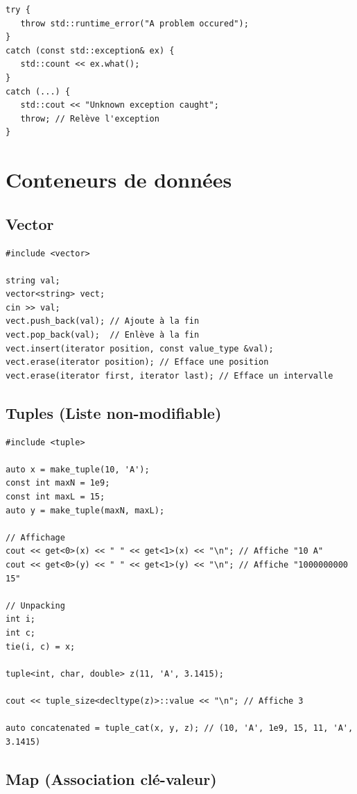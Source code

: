 \documentclass{article}
\begin{document}
\begin{multicols*}{3}
\begin{lstlisting}
try {
   throw std::runtime_error("A problem occured");
}
catch (const std::exception& ex) {
   std::count << ex.what();
}
catch (...) {
   std::cout << "Unknown exception caught";
   throw; // Relève l'exception
}
\end{lstlisting}

    \section*{Conteneurs de données}

    \subsection*{Vector}

    \begin{lstlisting}
#include <vector>

string val;
vector<string> vect;
cin >> val;
vect.push_back(val); // Ajoute à la fin
vect.pop_back(val);  // Enlève à la fin
vect.insert(iterator position, const value_type &val);
vect.erase(iterator position); // Efface une position
vect.erase(iterator first, iterator last); // Efface un intervalle

\end{lstlisting}

    \subsection*{Tuples (Liste non-modifiable)}

    \begin{lstlisting}
#include <tuple>

auto x = make_tuple(10, 'A');
const int maxN = 1e9;
const int maxL = 15;
auto y = make_tuple(maxN, maxL);

// Affichage
cout << get<0>(x) << " " << get<1>(x) << "\n"; // Affiche "10 A"
cout << get<0>(y) << " " << get<1>(y) << "\n"; // Affiche "1000000000 15"

// Unpacking
int i;
int c;
tie(i, c) = x;

tuple<int, char, double> z(11, 'A', 3.1415);

cout << tuple_size<decltype(z)>::value << "\n"; // Affiche 3

auto concatenated = tuple_cat(x, y, z); // (10, 'A', 1e9, 15, 11, 'A', 3.1415)

\end{lstlisting}

    \subsection*{Map (Association clé-valeur)}


\end{multicols*}
\end{document}
